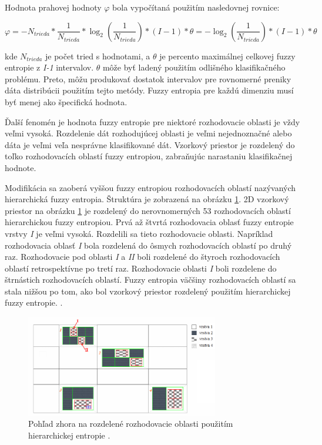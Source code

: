 Hodnota prahovej hodnoty $\varphi$ bola vypočítaná použitím nasledovnej rovnice:

$$\varphi= -N_{trieda} \ast \frac{1}{N_{trieda}} \ast \log_2{(\frac{1}{N_{trieda}})}\ast (I-1) \ast \theta = - \log_2{(\frac{1}{N_{trieda}})} \ast (I-1) \ast \theta$$


kde $N_{trieda}$ je počet tried s hodnotami, a $\theta$ je percento maximálnej celkovej fuzzy entropie z \textit{I-1} intervalov. $\theta$ môže byť ladený použitím odlišného klasifikačného problému. Preto, môžu produkovať dostatok intervalov pre rovnomerné preniky dáta distribúcii použitím tejto metódy. Fuzzy entropia pre každú dimenziu musí byť menej ako špecifická hodnota. 

Ďalší fenomén je hodnota fuzzy entropie pre niektoré rozhodovacie oblasti je vždy veľmi vysoká. Rozdelenie dát rozhodujúcej oblasti je veľmi nejednoznačné alebo dáta je veľmi veľa nesprávne klasifikované dát.  Vzorkový priestor je rozdelený do toľko rozhodovacích oblastí fuzzy entropiou, zabraňujúc narastaniu klasifikačnej hodnote. 

Modifikácia sa zaoberá vyššou fuzzy entropiou rozhodovacích oblastí nazývaných hierarchická fuzzy entropia.  Štruktúra je zobrazená na obrázku \ref{fig:decisionRegions}. 2D vzorkový priestor na obrázku \ref{fig:decisionRegions} je rozdelený do nerovnomerných 53 rozhodovacích oblastí hierarchickou fuzzy entropiou. Prvá až štvrtá rozhodovacia oblasť fuzzy entropie vrstvy \textit{I} je veľmi vysoká. Rozdelili sa tieto rozhodovacie oblasti. Napríklad rozhodovacia oblasť \textit{I} bola rozdelená do ôsmych rozhodovacích oblastí po druhý raz. Rozhodovacie pod oblasti \textit{I} a \textit{II} boli rozdelené do štyroch rozhodovacích oblastí retrospektívne po tretí raz. Rozhodovacie oblasti \textit{I} boli rozdelene do štrnástich rozhodovacích oblastí. Fuzzy entropia väčšiny rozhodovacích oblastí sa stala nižšou po tom, ako bol vzorkový priestor rozdelený použitím hierarchickej fuzzy entropie. \cite{cheng2006}.


\begin{figure}[h]
	\includegraphics[width=0.75\textwidth]{obrazky/decisionRegions}
	\centering
	\caption{Pohľad zhora na rozdelené rozhodovacie oblasti použitím hierarchickej entropie \cite{cheng2006}.} 
	\label{fig:decisionRegions}
\end{figure}



